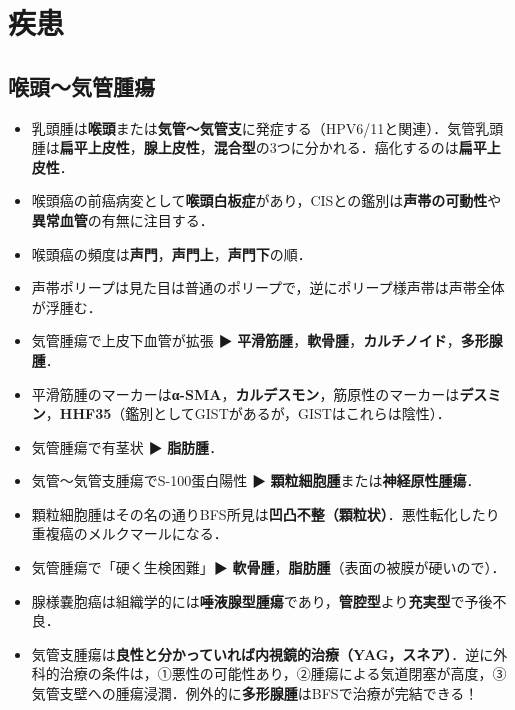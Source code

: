 
\section{疾患}
\subsection{喉頭〜気管腫瘍}
\begin{itemize}

\item 乳頭腫は\textbf{喉頭}または\textbf{気管〜気管支}に発症する（HPV6/11と関連）．気管乳頭腫は\textbf{扁平上皮性}，\textbf{腺上皮性}，\textbf{混合型}の3つに分かれる．癌化するのは\textbf{扁平上皮性}．

\item 喉頭癌の前癌病変として\textbf{喉頭白板症}があり，CISとの鑑別は\textbf{声帯の可動性}や\textbf{異常血管}の有無に注目する．
\item 喉頭癌の頻度は\textbf{声門}，\textbf{声門上}，\textbf{声門下}の順．
\item 声帯ポリープは見た目は普通のポリープで，逆にポリープ様声帯は声帯全体が浮腫む．

\item 気管腫瘍で上皮下血管が拡張 ▶ \textbf{平滑筋腫}，\textbf{軟骨腫}，\textbf{カルチノイド}，\textbf{多形腺腫}．
\item 平滑筋腫のマーカーは\textbf{α-SMA}，\textbf{カルデスモン}，筋原性のマーカーは\textbf{デスミン}，\textbf{HHF35}（鑑別としてGISTがあるが，GISTはこれらは陰性）．
\item 気管腫瘍で有茎状 ▶ \textbf{脂肪腫}．
\item 気管〜気管支腫瘍でS-100蛋白陽性 ▶ \textbf{顆粒細胞腫}または\textbf{神経原性腫瘍}．
\item 顆粒細胞腫はその名の通りBFS所見は\textbf{凹凸不整（顆粒状）}．悪性転化したり重複癌のメルクマールになる．
\item 気管腫瘍で「硬く生検困難」▶ \textbf{軟骨腫}，\textbf{脂肪腫}（表面の被膜が硬いので）．

\item 腺様嚢胞癌は組織学的には\textbf{唾液腺型腫瘍}であり，\textbf{管腔型}より\textbf{充実型}で予後不良．

\item 気管支腫瘍は\textbf{良性と分かっていれば内視鏡的治療（YAG，スネア）}．逆に外科的治療の条件は，①悪性の可能性あり，②腫瘍による気道閉塞が高度，③気管支壁への腫瘍浸潤．例外的に\textbf{多形腺腫}はBFSで治療が完結できる！
\end{itemize}
